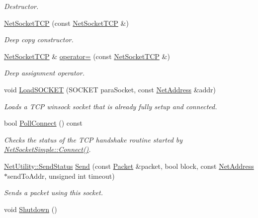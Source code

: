 \begin{DoxyCompactItemize}
\begin{DoxyCompactList}\small\item\em Destructor. \item\end{DoxyCompactList}\item 
\hyperlink{class_net_socket_t_c_p_ab8958e92980c0f82dc75c2dc59e05577}{NetSocketTCP} (const \hyperlink{class_net_socket_t_c_p}{NetSocketTCP} \&)
\begin{DoxyCompactList}\small\item\em Deep copy constructor. \item\end{DoxyCompactList}\item 
\hyperlink{class_net_socket_t_c_p}{NetSocketTCP} \& \hyperlink{class_net_socket_t_c_p_a5307a3b22575686da141a3929e5eb3be}{operator=} (const \hyperlink{class_net_socket_t_c_p}{NetSocketTCP} \&)
\begin{DoxyCompactList}\small\item\em Deep assignment operator. \item\end{DoxyCompactList}\item 
void \hyperlink{class_net_socket_t_c_p_a2c2fc5b7ff9f35930f566b6913b67aef}{LoadSOCKET} (SOCKET paraSocket, const \hyperlink{class_net_address}{NetAddress} \&addr)
\begin{DoxyCompactList}\small\item\em Loads a TCP winsock socket that is already fully setup and connected. \item\end{DoxyCompactList}\item 
bool \hyperlink{class_net_socket_t_c_p_a211e98d94191998d689e4ddc0714f18d}{PollConnect} () const 
\begin{DoxyCompactList}\small\item\em Checks the status of the TCP handshake routine started by \hyperlink{class_net_socket_simple_a8b3d61a80b904f12791144ba336cf37b}{NetSocketSimple::Connect()}. \item\end{DoxyCompactList}\item 
\hyperlink{class_net_utility_a8051eca61204ffd818281419bbf44736}{NetUtility::SendStatus} \hyperlink{class_net_socket_t_c_p_a0c81335a45d43fc31073596bee96f7c0}{Send} (const \hyperlink{class_packet}{Packet} \&packet, bool block, const \hyperlink{class_net_address}{NetAddress} $\ast$sendToAddr, unsigned int timeout)
\begin{DoxyCompactList}\small\item\em Sends a packet using this socket. \item\end{DoxyCompactList}\item 
\hypertarget{class_net_socket_t_c_p_a31775717fef7b062f9af098ca5e6b7c9}{
void \hyperlink{class_net_socket_t_c_p_a31775717fef7b062f9af098ca5e6b7c9}{Shutdown} ()}
\label{class_net_socket_t_c_p_a31775717fef7b062f9af098ca5e6b7c9}


\end{DoxyCompactItemize}
